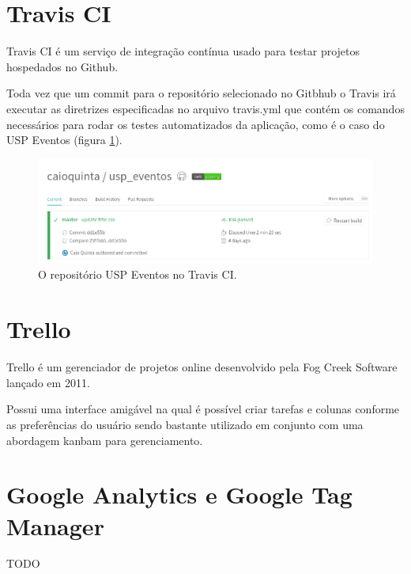 \section{Travis CI}
\par Travis CI é um serviço de integração contínua usado para testar projetos hospedados no Github.
\par Toda vez que um commit para o repositório selecionado no Gitbhub o Travis irá executar as diretrizes especificadas no arquivo travis.yml que contém os comandos necessários para rodar os testes automatizados da aplicação, como é o caso do USP Eventos (figura \ref{fig:travis}).
\begin{figure}[htb]
\centering
\includegraphics[width=15cm]{figuras/travis}
\caption{\label{fig:travis} O repositório USP Eventos no Travis CI.}
\end{figure}

\section{Trello}
\par Trello é um gerenciador de projetos online desenvolvido pela Fog Creek Software lançado em 2011.
\par Possui uma interface amigável na qual é possível criar tarefas e colunas conforme as preferências do usuário sendo bastante utilizado em conjunto com uma abordagem kanbam para gerenciamento.

\section{Google Analytics e Google Tag Manager}
TODO
